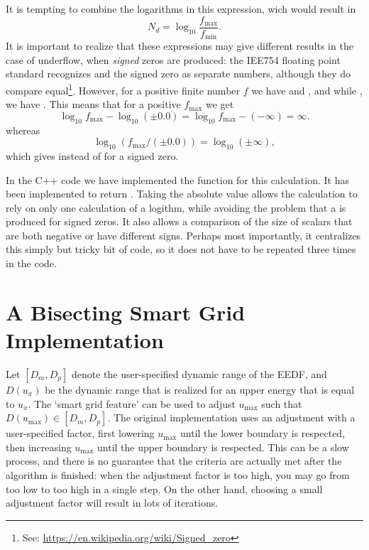 \documentclass{book}
\begin{document}
It is tempting to combine the logarithms in this expression, wich would
result in
\begin{equation}
    N_d= \log_{10} \frac{f_{\text{max}}}{f_{\text{min}}}.
\end{equation}
It is important to realize that these expressions may give different
results in the case of underflow, when {\em signed} zeros are produced:
the IEE754 floating point standard recognizes  and the
signed zero  as separate numbers, although they do compare
equal\footnote{See: \url{https://en.wikipedia.org/wiki/Signed_zero}}.
However, for a positive finite number $f$ we have 
and , and while , we have
. This means that for a positive $f_{\text{max}}$ we get
\begin{equation}
    \log_{10} f_{\text{max}} - \log_{10}(\pm 0.0)
  = \log_{10} f_{\text{max}} - (-\infty) = \infty.
\end{equation}
whereas
\begin{equation}
  \log_{10} (f_{\text{max}}/(\pm 0.0)) = \log_{10}(\pm\infty),
\end{equation}
which gives  instead of  for a signed zero.

In the C++ code we have implemented the function 
for this calculation. It has been implemented to return
. Taking the absolute value allows the calculation
to rely on only one calculation of a logithm, while avoiding the problem
that a  is produced for signed zeros. It also allows a comparison
of the size of scalars that are both negative or have different signs.
Perhaps most importantly, it centralizes this simply but tricky bit of
code, so it does not have to be repeated three times in the code.

\section{A Bisecting Smart Grid Implementation}

Let $[D_m,D_p]$ denote the user-specified dynamic range of the EEDF,
and $D(u_x)$ be the dynamic range that is realized for an upper
energy that is equal to $u_x$. The `smart grid feature' can be used
to adjust $u_{\text{max}}$ such that $D(u_{\text{max}})\in[D_m,D_p]$.
The original implementation uses an adjustment with a user-specified
factor, first lowering $u_{\text{max}}$ until the lower boundary is
respected, then increasing $u_{\text{max}}$ until the upper boundary
is respected. This can be a slow process, and there is no guarantee
that the criteria are actually met after the algorithm is finished:
when the adjustment factor is too high, you may go from too low to
too high in a single step. On the other hand, choosing a small
adjustment factor will result in lots of iterations.
\end{document}
